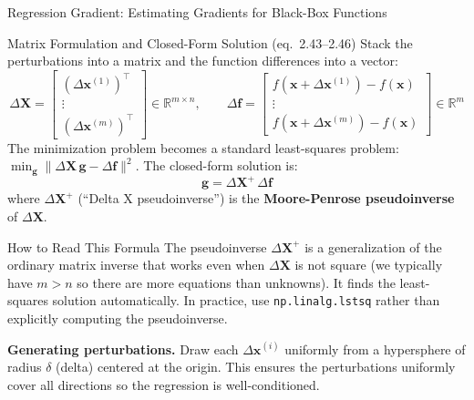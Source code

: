 \documentclass[aspectratio=169,10pt]{beamer}
\newcommand{\x}{\mathbf{x}}
\begin{document}
\begin{frame}[allowframebreaks]{Regression Gradient: Estimating Gradients for Black-Box Functions}
  \framebreak

  \begin{block}{Matrix Formulation and Closed-Form Solution (eq.\ 2.43--2.46)}
    Stack the perturbations into a matrix and the function differences
    into a vector:
    \[
      \Delta\mathbf{X}
      =
      \begin{bmatrix}
        (\Delta\x^{(1)})^\top \\
        \vdots \\
        (\Delta\x^{(m)})^\top
      \end{bmatrix}
      \in \mathbb{R}^{m\times n},
      \qquad
      \Delta\mathbf{f}
      =
      \begin{bmatrix}
        f(\x+\Delta\x^{(1)})-f(\x) \\
        \vdots \\
        f(\x+\Delta\x^{(m)})-f(\x)
      \end{bmatrix}
      \in \mathbb{R}^m
    \]
    The minimization problem becomes a standard least-squares problem:
    $\min_{\mathbf{g}} \|\Delta\mathbf{X}\,\mathbf{g} - \Delta\mathbf{f}\|^2$.
    The closed-form solution is:
    \[
      \boxed{\mathbf{g} = \Delta\mathbf{X}^{+}\,\Delta\mathbf{f}}
    \]
    where $\Delta\mathbf{X}^{+}$ (``Delta X pseudoinverse'') is the
    \textbf{Moore-Penrose pseudoinverse} of $\Delta\mathbf{X}$.
  \end{block}

  \begin{alertblock}{How to Read This Formula}
    The pseudoinverse $\Delta\mathbf{X}^{+}$ is a generalization of the
    ordinary matrix inverse that works even when $\Delta\mathbf{X}$ is
    not square (we typically have $m > n$ so there are more equations
    than unknowns).  It finds the least-squares solution automatically.
    In practice, use \texttt{np.linalg.lstsq} rather than explicitly
    computing the pseudoinverse.
  \end{alertblock}

  \textbf{Generating perturbations.}
  Draw each $\Delta\x^{(i)}$ uniformly from a hypersphere of radius
  $\delta$ (delta) centered at the origin.  This ensures the perturbations
  uniformly cover all directions so the regression is well-conditioned.

\end{frame}
\end{document}
